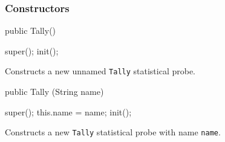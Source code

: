 \subsubsection* {Constructors}
\begin{code}

   public Tally() \begin{hide} {
      super();
      init();
   } \end{hide}
\end{code}
  \begin{tabb}  Constructs a new unnamed \texttt{Tally} statistical probe.
 \end{tabb}
\begin{code}

   public Tally (String name) \begin{hide} {
      super();
      this.name = name;
      init();
   } \end{hide}
\end{code}
  \begin{tabb}  Constructs a new \texttt{Tally} statistical probe with
   name \texttt{name}.
 \end{tabb}
\begin{htmlonly}
\end{htmlonly}

